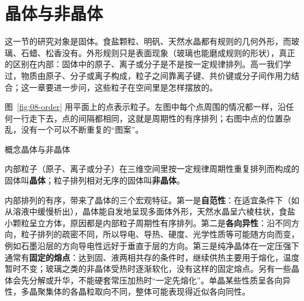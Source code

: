 \documentclass[UTF8,a4paper,zihao=5,oneside,openany,fontset=none]{ctexbook}
\def\heiti{\CJKfamily{zhhei}}
\newcommand{\textheading}[2]{\par\addvspace{.6em}\Needspace{4\baselineskip}\noindent
 {\heiti\if\relax\detokenize{#2}\relax #1\else #2\fi}\par\nobreak\smallskip\nobreak\color{black}\ignorespaces}
\newenvironment{gainian}[1][]{\textheading{概念}{#1}}{\par\smallskip}
\begin{document}
\section{晶体与非晶体}

这一节的研究对象是固体。食盐颗粒、明矾、天然水晶都有规则的几何外形，而玻璃、石蜡、松香没有。外形规则只是表面现象（玻璃也能磨成规则的形状），真正的区别在内部：固体中的原子、离子或分子是不是按一定规律排列。高一我们学过，物质由原子、分子或离子构成，粒子之间靠离子键、共价键或分子间作用力结合；这一章要进一步问，这些粒子在空间里是怎样摆放的。

图~\ref{fig:08-order} 用平面上的点表示粒子。左图中每个点周围的情况都一样，沿任何一行走下去，点的间隔都相同，这就是周期性的有序排列；右图中点的位置杂乱，没有一个可以不断重复的“图案”。


\begin{gainian}[晶体与非晶体]
内部粒子（原子、离子或分子）在三维空间里按一定规律周期性重复排列而构成的固体叫\textbf{晶体}；粒子排列相对无序的固体叫\textbf{非晶体}。
\end{gainian}

内部排列的有序，带来了晶体的三个宏观特征。第一是\textbf{自范性}：在适宜条件下（如从溶液中缓慢析出），晶体能自发地呈现多面体外形，天然水晶呈六棱柱状，食盐小颗粒呈立方体，原因都是内部粒子周期性有序排列。第二是\textbf{各向异性}：沿不同方向，粒子排列的疏密不同，所以导电、导热、硬度、光学性质等可能随方向而变，例如石墨沿层的方向导电性远好于垂直于层的方向。第三是纯净晶体在一定压强下通常有\textbf{固定的熔点}：达到固、液两相共存的条件时，继续供热主要用于熔化，温度暂时不变；玻璃之类的非晶体受热时逐渐软化，没有这样的固定熔点。另有一些晶体会先分解或升华，不能硬套常压加热时“一定先熔化”。单晶某些性质呈各向异性，多晶聚集体的各晶粒取向不同，整体可能表现得近似各向同性。
\end{document}

